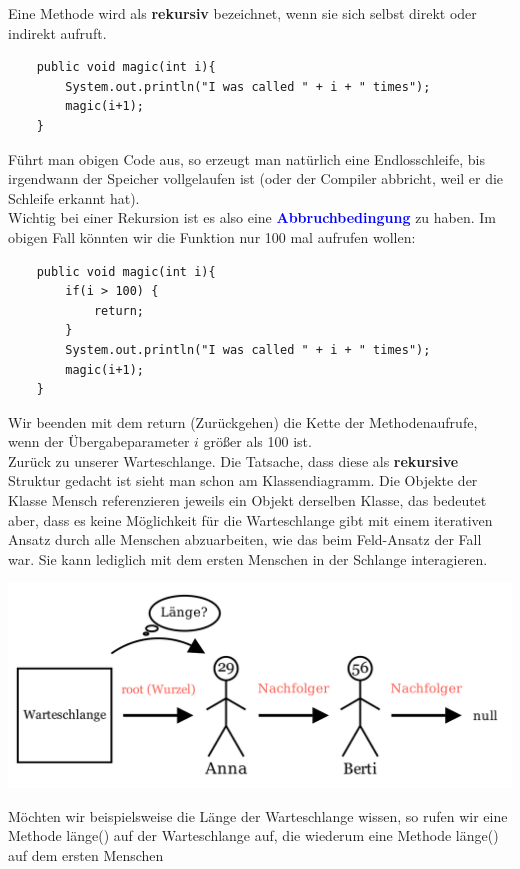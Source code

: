 \documentclass{article}
\begin{document}
\begin{defi}[Rekursion]
Eine Methode wird als \textbf{rekursiv} bezeichnet, wenn sie sich selbst direkt oder indirekt
aufruft.
\end{defi}
\bsp 
\begin{verbatim}
    public void magic(int i){
        System.out.println("I was called " + i + " times");
        magic(i+1);
    }
\end{verbatim}
Führt man obigen Code aus, so erzeugt man natürlich eine Endlosschleife, bis irgendwann der 
Speicher vollgelaufen ist (oder der Compiler abbricht, weil er die Schleife erkannt hat). \\
Wichtig bei einer Rekursion ist es also eine \textcolor{blue}{\textbf{Abbruchbedingung}} zu haben. 
Im obigen Fall könnten wir die Funktion nur 100 mal aufrufen wollen:
\begin{verbatim}
    public void magic(int i){
        if(i > 100) {
            return;
        }
        System.out.println("I was called " + i + " times");
        magic(i+1);
    }
\end{verbatim}
Wir beenden mit dem return (Zurückgehen) die Kette der Methodenaufrufe, wenn der Übergabeparameter $i$ größer als 100 ist. \\ 
Zurück zu unserer Warteschlange. Die Tatsache, dass diese als \textbf{rekursive} Struktur 
gedacht ist sieht man schon am Klassendiagramm. Die Objekte der Klasse Mensch 
referenzieren jeweils ein Objekt derselben Klasse, 
das bedeutet aber, dass es keine Möglichkeit für die Warteschlange gibt mit einem iterativen 
Ansatz durch alle Menschen abzuarbeiten, wie das beim Feld-Ansatz der Fall war. Sie kann 
lediglich mit dem ersten Menschen in der Schlange interagieren. 
\begin{center}
    \includegraphics[scale = 0.25]{../../media/linked_list_length.png}
\end{center}
Möchten wir beispielsweise die Länge der Warteschlange wissen, so rufen wir eine Methode 
länge() auf der Warteschlange auf, die wiederum eine Methode länge() auf dem ersten Menschen
\end{document}

